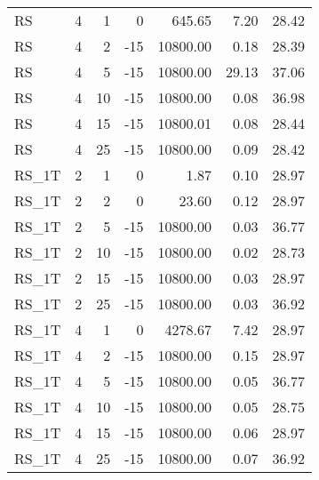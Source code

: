 \begin{center}
\begin{longtable}{lrrrrrr}
  RS     & 4 & 1 &   0 & 645.65 & 7.20 & 28.42 \\ 
  RS     & 4 & 2 & -15 & 10800.00 & 0.18 & 28.39 \\ 
  RS     & 4 & 5 & -15 & 10800.00 & 29.13 & 37.06 \\ 
  RS     & 4 & 10 & -15 & 10800.00 & 0.08 & 36.98 \\ 
  RS     & 4 & 15 & -15 & 10800.01 & 0.08 & 28.44 \\ 
  RS     & 4 & 25 & -15 & 10800.00 & 0.09 & 28.42 \\ 
  RS\_1T     & 2 & 1 &   0 & 1.87 & 0.10 & 28.97 \\ 
  RS\_1T     & 2 & 2 &   0 & 23.60 & 0.12 & 28.97 \\ 
  RS\_1T     & 2 & 5 & -15 & 10800.00 & 0.03 & 36.77 \\ 
  RS\_1T     & 2 & 10 & -15 & 10800.00 & 0.02 & 28.73 \\ 
  RS\_1T     & 2 & 15 & -15 & 10800.00 & 0.03 & 28.97 \\ 
  RS\_1T     & 2 & 25 & -15 & 10800.00 & 0.03 & 36.92 \\ 
  RS\_1T     & 4 & 1 &   0 & 4278.67 & 7.42 & 28.97 \\ 
  RS\_1T     & 4 & 2 & -15 & 10800.00 & 0.15 & 28.97 \\ 
  RS\_1T     & 4 & 5 & -15 & 10800.00 & 0.05 & 36.77 \\ 
  RS\_1T     & 4 & 10 & -15 & 10800.00 & 0.05 & 28.75 \\ 
  RS\_1T     & 4 & 15 & -15 & 10800.00 & 0.06 & 28.97 \\ 
  RS\_1T     & 4 & 25 & -15 & 10800.00 & 0.07 & 36.92 \\ 
\end{longtable}
\end{center}
